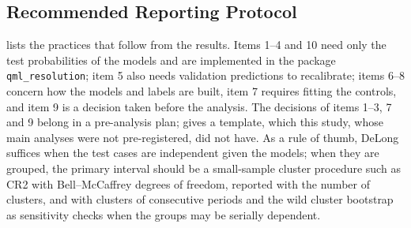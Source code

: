 \documentclass[11pt,a4paper]{article}
\begin{document}
\subsection{Recommended Reporting Protocol}
\label{sec:protocol}

 lists the practices that follow from the results. Items 1--4 and 10 need only the test probabilities of the models and are implemented in the package \texttt{qml\_resolution}; item 5 also needs validation predictions to recalibrate; items 6--8 concern how the models and labels are built, item 7 requires fitting the controls, and item 9 is a decision taken before the analysis. The decisions of items 1--3, 7 and 9 belong in a pre-analysis plan;  gives a template, which this study, whose main analyses were not pre-registered, did not have. As a rule of thumb, DeLong suffices when the test cases are independent given the models; when they are grouped, the primary interval should be a small-sample cluster procedure such as CR2 with Bell--McCaffrey degrees of freedom, reported with the number of clusters, and with clusters of consecutive periods and the wild cluster bootstrap as sensitivity checks when the groups may be serially dependent.
\end{document}

